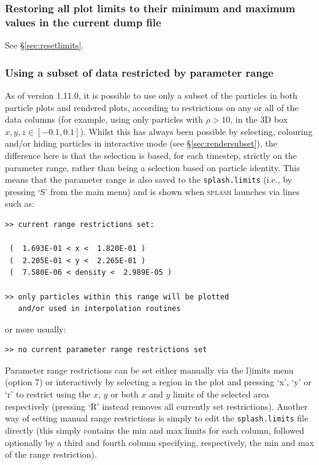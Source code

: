 \documentclass[a4paper,10pt]{article}
\newcommand{\splash}{\textsc{splash }}
\begin{document}
\subsubsection{ Restoring all plot limits to their minimum and maximum values in the current dump file}
See \S\ref{sec:resetlimits}.

\subsubsection{ Using a subset of data restricted by parameter range}
\label{sec:rangerestrict}
 As of version 1.11.0, it is possible to use only a subset of the particles in both particle plots and rendered plots, according to restrictions on any or all of the data columns (for example, using only particles with $\rho > 10$, in the 3D box $x,y,z  \in [-0.1, 0.1]$). Whilst this has always been possible by selecting, colouring and/or hiding particles in interactive mode (see \S\ref{sec:rendersubset}), the difference here is that the selection is based, for each timestep, strictly on the parameter range, rather than being a selection based on particle identity. This means that the parameter range is also saved to the \verb+splash.limits+ (i.e., by pressing `S' from the main menu) and is shown when \splash launches via lines such as:
\begin{verbatim}
>> current range restrictions set: 

 (  1.693E-01 < x <  1.820E-01 )
 (  2.205E-01 < y <  2.265E-01 )
 (  7.580E-06 < density <  2.989E-05 )

>> only particles within this range will be plotted 
   and/or used in interpolation routines
\end{verbatim}
or more usually:
\begin{verbatim}
>> no current parameter range restrictions set 
\end{verbatim}

 Parameter range restrictions can be set either manually via the l)imits menu (option 7) or interactively by selecting a region in the plot and pressing `x', `y' or `r' to restrict using the $x$, $y$ or both $x$ and $y$ limits of the selected area respectively (pressing `R' instead removes all currently set restrictions). Another way of setting manual range restrictions is simply to edit the \verb+splash.limits+ file directly (this simply contains the min and max limits for each column, followed optionally by a third and fourth column specifying, respectively, the min and max of the range restriction).
\end{document}
